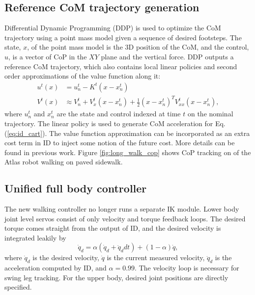 \documentclass{ws-ijhr}
\newcommand{\eref}[1] {Eq. (\ref{#1})}
\newcommand{\fref}[1] {Figure \ref{#1}}
\begin{document}
\subsection{Reference CoM trajectory generation}
Differential Dynamic Programming (DDP) \cite{ddp} is used to optimize the CoM
trajectory using a point mass model given a sequence of desired footsteps. 
The state, $x$, of the point mass model is the 3D position of the CoM,
and the control, $u$, is a vector of CoP in the $XY$ plane and the vertical 
force. 
DDP outputs a reference CoM trajectory, which also contains local linear 
policies and second order approximations of the value function along it:
\begin{equation}
	\begin{split}
	  u^t(x) &= u^t_n - K^t(x-x^t_n) \\
		V^t(x) &\approx V^t_n + V^t_x (x-x^t_n) + \frac{1}{2}(x-x^t_n)^TV^t_{xx}(x-x^t_n),
	\end{split}
	\label{eq:ddp_res}
\end{equation} 
where $u^t_n$ and $x^t_n$ are the  state and control indexed at time $t$ on
the nominal trajectory. 
The linear policy is used to generate CoM acceleration for \eref{eq:id_cart}.
The value function approximation can be incorporated as an extra cost term 
in ID to inject some notion of the future cost. More details can be found 
in previous work. \cite{sfeng_online,sfeng_proposal}
\fref{fig:long_walk_cop} shows CoP tracking on of the Atlas robot walking on
paved sidewalk. 

\subsection{Unified full body controller}
The new walking controller no longer runs a separate IK module. 
Lower body joint level servos consist of only velocity and torque feedback 
loops. 
The desired torque comes straight from the output of ID, and the desired 
velocity is integrated leakily by
\begin{equation}
  \dot{q}_d = \alpha (\dot{q}_d + \ddot{q}_d dt) + (1-\alpha) \dot{q},
	\label{eq:qd_int}
\end{equation} 
where $\dot{q}_d$ is the desired velocity, $\dot{q}$ is the current 
measured velocity, $\ddot{q}_d$ is the acceleration computed by ID, and $\alpha = 0.99$. 
The velocity loop is necessary for swing leg tracking. 
For the upper body, desired joint positions are directly specified.
\end{document}
